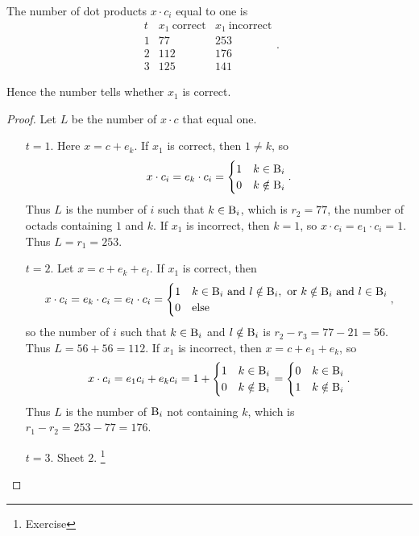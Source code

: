 \begin{proposition}
The number of dot products $ x \cdot c_i $ equal to one is
$$
\begin{array}{c|cc}
t & x_1 \ \text{correct} & x_1 \ \text{incorrect} \\
\hline
1 & 77 & 253 \\
2 & 112 & 176 \\
3 & 125 & 141
\end{array}.
$$
\end{proposition}


Hence the number tells whether $ x_1 $ is correct.

\pagebreak

\begin{proof}
Let $ L $ be the number of $ x \cdot c $ that equal one.
\begin{itemize}
\item[$ t = 1 $.] Here $ x = c + e_k $. If $ x_1 $ is correct, then $ 1 \ne k $, so
$$ x \cdot c_i = e_k \cdot c_i =
\begin{cases}
1 & k \in \mathrm{B}_i \\
0 & k \notin \mathrm{B}_i \\
\end{cases}.
$$
Thus $ L $ is the number of $ i $ such that $ k \in \mathrm{B}_i $, which is $ r_2 = 77 $, the number of octads containing $ 1 $ and $ k $. If $ x_1 $ is incorrect, then $ k = 1 $, so $ x \cdot c_i = e_1 \cdot c_i = 1 $. Thus $ L = r_1 = 253 $.
\item[$ t = 2 $.] Let $ x = c + e_k + e_l $. If $ x_1 $ is correct, then
$$ x \cdot c_i = e_k \cdot c_i = e_l \cdot c_i =
\begin{cases}
1 & k \in \mathrm{B}_i \ \text{and} \ l \notin \mathrm{B}_i, \ \text{or} \ k \notin \mathrm{B}_i \ \text{and} \ l \in \mathrm{B}_i \\
0 & \text{else}
\end{cases},
$$
so the number of $ i $ such that $ k \in \mathrm{B}_i $ and $ l \notin \mathrm{B}_i $ is $ r_2 - r_3 = 77 - 21 = 56 $. Thus $ L = 56 + 56 = 112 $. If $ x_1 $ is incorrect, then $ x = c + e_1 + e_k $, so
$$ x \cdot c_i = e_1c_i + e_kc_i = 1 +
\begin{cases}
1 & k \in \mathrm{B}_i \\
0 & k \notin \mathrm{B}_i \\
\end{cases}
=
\begin{cases}
0 & k \in \mathrm{B}_i \\
1 & k \notin \mathrm{B}_i \\
\end{cases}.
$$
Thus $ L $ is the number of $ \mathrm{B}_i $ not containing $ k $, which is $ r_1 - r_2 = 253 - 77 = 176 $.
\item[$ t = 3 $.] Sheet $ 2 $. \footnote{Exercise}
\end{itemize}
\end{proof}

